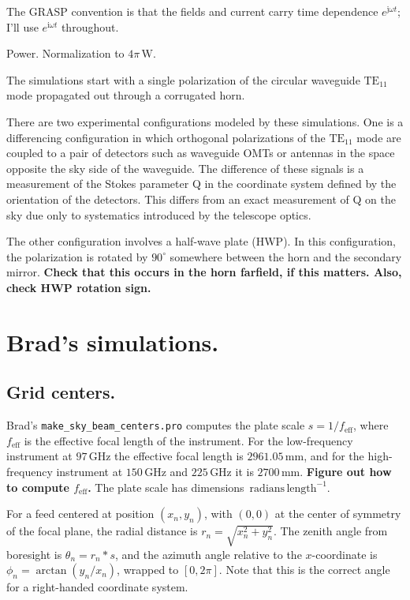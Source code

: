 \documentclass[10pt,english]{article}
\newcommand{\ii}{\mathrm{i}}
\newcommand{\unit}[ 1 ]{\, \textrm{#1}}
\begin{document}
The GRASP convention is that the fields and current carry time dependence $e^{\mathrm{j} \omega t}$; I'll use $e^{\ii \omega t}$ throughout.

Power. Normalization to $4 \pi \unit{W}$.

The simulations start with a single polarization of the circular waveguide $\text{TE}_{11}$ mode propagated out through a corrugated horn.

There are two experimental configurations modeled by these simulations. One is a differencing configuration in which orthogonal polarizations of the $\text{TE}_{11}$ mode are coupled to a pair of detectors such as waveguide OMTs or antennas in the space opposite the sky side of the waveguide. The difference of these signals is a measurement of the Stokes parameter Q in the coordinate system defined by the orientation of the detectors. This differs from an exact measurement of Q on the sky due only to systematics introduced by the telescope optics.

The other configuration involves a half-wave plate (HWP). In this configuration, the polarization is rotated by $90^{\circ}$ somewhere between the horn and the secondary mirror. \textbf{Check that this occurs in the horn farfield, if this matters. Also, check HWP rotation sign.}

\section*{Brad's simulations.}

\subsection*{Grid centers.}

Brad's \texttt{make\_sky\_beam\_centers.pro} computes the plate scale $s = 1 / f_{\text{eff}}$, where $f_{\text{eff}}$ is the effective focal length of the instrument. For the low-frequency instrument at $97 \unit{GHz}$ the effective focal length is $2961.05 \unit{mm}$, and for the high-frequency instrument at $150 \unit{GHz}$ and $225 \unit{GHz}$ it is $2700 \unit{mm}$. \textbf{Figure out how to compute $f_{\text{eff}}$.} The plate scale has dimensions $\unit{radians} \unit{length}^{-1}$.

For a feed centered at position $(x_{n}, y_{n})$, with $(0, 0)$ at the center of symmetry of the focal plane, the radial distance is $r_{n} = \sqrt{x_{n}^{2} + y_{n}^{2}}$. The zenith angle from boresight is $\theta_{n} = r_{n} * s$, and the azimuth angle relative to the $x$-coordinate is $\phi_{n} = \arctan(y_{n} / x_{n})$, wrapped to $[0, 2 \pi]$. Note that this is the correct angle for a right-handed coordinate system.
\end{document}
